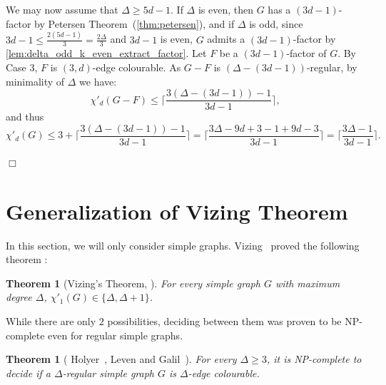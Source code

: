 \documentclass[11pt]{article}
\newtheorem{theorem}[lemma]{Theorem}
\newcounter{claim}
\newenvironment{proof}[1][]%
 {\noindent {\setcounter{claim}{0}\sc proof ---
   }{#1}{}}{\hfill$\Box$\vspace{2ex}}
\begin{document}
\begin{proof}
We may now assume that $\Delta \geq 5d-1$. 
If $\Delta$ is even, then $G$ has a $(3d-1)$-factor by Petersen Theorem~(\ref{thm:petersen}), and if $\Delta$ is odd, since $3d-1 \leq \frac{2(5d-1)}{3} = \frac{2\Delta}{3}$ and $3d-1$ is even, $G$ admits a $(3d-1)$-factor by \eqref{lem:delta_odd_k_even_extract_factor}. 
Let $F$ be a $(3d-1)$-factor of $G$. 
By Case 3, $F$ is $(3,d)$-edge colourable. As $G - F$ is $(\Delta - (3d - 1))$-regular, by minimality of $\Delta$ we have:
$$\chi'_{d}(G-F) \leq \lceil \frac{3(\Delta - (3d - 1)) - 1}{3d - 1} \rceil,$$
and thus 
$$\chi'_{d}(G) \leq 3 + \lceil \frac{3(\Delta - (3d - 1)) - 1}{3d - 1} \rceil = \lceil \frac{3\Delta - 9d + 3 - 1 + 9d - 3}{3d-1} \rceil = \lceil \frac{3\Delta - 1}{3d - 1} \rceil.$$

\end{proof}


\section{Generalization of Vizing Theorem}\label{sec:simple}


In this section, we will only consider simple graphs. Vizing~\cite{V64} proved the following theorem :

\begin{theorem}[Vizing's Theorem,  \cite{V64}] \label{thm:vizing}
For every simple graph $G$ with maximum degree $\Delta$, $\chi'_{1}(G) \in \{ \Delta, \Delta + 1 \}$.
\end{theorem}

While there are only $2$ possibilities, deciding between them was proven to be NP-complete even for regular simple graphs. 

\begin{theorem}[ Holyer~\cite{H81}, Leven and Galil~\cite{LZ83}]
\label{thm:chromatic_index_NP_complete}
For every $\Delta \geq 3$, it is NP-complete to decide if a $\Delta$-regular simple graph $G$ is $\Delta$-edge colourable. 
\end{theorem}
\end{document}
